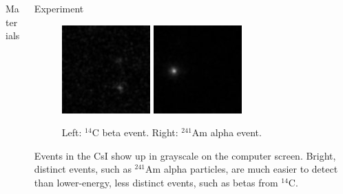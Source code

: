 \documentclass[final]{beamer}
\newlength{\onecolwid}
\newlength{\twocolwid}
\begin{document}
\begin{frame}[t]
\begin{columns}[t]
\begin{column}{\twocolwid}
\begin{columns}[t,totalwidth=\twocolwid]
\begin{column}{\onecolwid}
\begin{block}{Materials}
\end{block}


\end{column} %

\begin{column}{\onecolwid}\vspace{-.6in} %


\begin{block}{Experiment}

\begin{figure}
\includegraphics[width=0.35\linewidth]{c14.png}
\hspace{0.05\linewidth}
\includegraphics[width=0.35\linewidth]{am.jpg}
\caption{Left: $^{14}$C beta event. Right: $^{241}$Am alpha event.}
\label{fig:events}
\end{figure}

Events in the CsI show up in grayscale on the computer screen. Bright, distinct events, such as $^{241}$Am alpha particles, are much easier to detect than lower-energy, less distinct events, such as betas from $^{14}$C. 

\end{block}



\end{column}
\end{columns}
\end{column}
\end{columns}
\end{frame}
\end{document}
